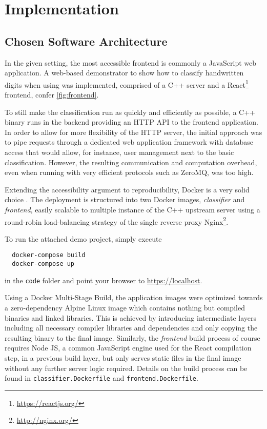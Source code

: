 \chapter{Implementation}
\label{chap:implementation}

\section{Chosen Software Architecture}
In the given setting, the most accessible frontend is commonly a JavaScript web application.
A web-based demonstrator to show how to classify handwritten digits when using  was implemented, comprised of a C++ server and a React\footnote{\url{https://reactjs.org/}} frontend, confer \cref{fig:frontend}.

To still make the classification run as quickly and efficiently as possible, a C++ binary runs in the backend providing an HTTP API to the frontend application.
In order to allow for more flexibility of the HTTP server, the initial approach was to pipe requests through a dedicated web application framework with database access that would allow, for instance, user management next to the basic classification.
However, the resulting communication and computation overhead, even when running with very efficient protocols such as ZeroMQ, was too high.

Extending the accessibility argument to reproducibility, Docker is a very solid choice \parencite{using-docker-in-science}.
The deployment is structured into two Docker images, \textit{classifier} and \textit{frontend}, easily scalable to multiple instance of the C++ upstream server using a round-robin load-balancing strategy of the single reverse proxy Nginx\footnote{\url{http://nginx.org/}}.

To run the attached demo project, simply execute
\begin{verbatim}
  docker-compose build
  docker-compose up
\end{verbatim}
in the \texttt{code} folder and point your browser to \url{https://localhost}.

Using a Docker Multi-Stage Build, the application images were optimized towards a zero-dependency Alpine Linux image which contains nothing but compiled binaries and linked libraries.
This is achieved by introducing intermediate layers including all necessary compiler libraries and dependencies and only copying the resulting binary to the final image.
Similarly, the \textit{frontend} build process of course requires Node JS, a common JavaScript engine used for the React compilation step, in a previous build layer, but only serves static files in the final image without any further server logic required.
Details on the build process can be found in \texttt{classifier.Dockerfile} and \texttt{frontend.Dockerfile}.

